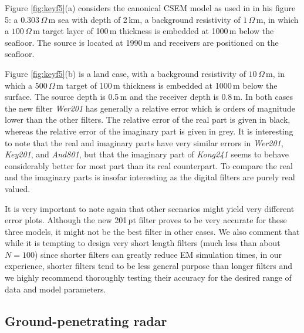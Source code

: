\documentclass[paper,twocolumn,twoside]{geophysics}
\begin{document}
Figure \ref{fig:keyf5}(a) considers the canonical CSEM model as used in
\cite{GEO.12.Key} in his figure 5: a $0.303\,\Omega\,$m sea with depth of
2\,km, a background resistivity of $1\,\Omega\,$m, in which a $100\,\Omega\,$m
target layer of 100\,m thickness is embedded at 1000\,m below the seafloor.
The source is located at 1990\,m and receivers are positioned on the seafloor.
%
%

Figure \ref{fig:keyf5}(b) is a land case, with a background resistivity of
$10\,\Omega\,$m, in which a $500\,\Omega\,$m target of 100\,m thickness is
embedded at 1000\,m below the surface. The source depth is 0.5\,m and the
receiver depth is 0.8\,m. In both cases the new filter \emph{Wer201} has
generally a relative error which is orders of magnitude lower than the other
filters. The relative error of the real part is given in black, whereas the
relative error of the imaginary part is given in grey. It is interesting to
note that the real and imaginary parts have very similar errors in
\emph{Wer201}, \emph{Key201}, and \emph{And801}, but that the imaginary part of
\emph{Kong241} seems to behave considerably better for most part than its real
counterpart. To compare the real and the imaginary parts is insofar interesting
as the digital filters are purely real valued.

It is very important to note again that other scenarios might yield very
different error plots. Although the new 201\,pt filter proves to be very
accurate for these three models, it might not be the best filter in other
cases.  We also comment that while it is tempting to design very short length
filters (much less than about $N=100$) since shorter filters can greatly reduce
EM simulation times, in our experience, shorter filters tend to be less general
purpose than longer filters and we highly recommend thoroughly testing their
accuracy for the desired range of data and model parameters.

\subsection{Ground-penetrating radar}
\end{document}
